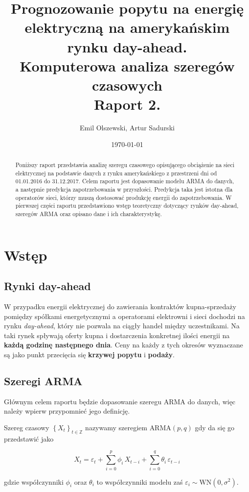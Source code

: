 \documentclass[11pt]{article}
\author{Emil Olszewski, Artur Sadurski}
\date{\today}
\title{Prognozowanie popytu na energię elektryczną na amerykańskim rynku day-ahead. \\ \large Komputerowa analiza szeregów czasowych \\ \large Raport 2. }
\begin{document}
\maketitle

\begin{abstract}
Poniższy raport przedstawia analizę szeregu czasowego opisującego obciążenie na sieci elektrycznej na podstawie danych z rynku amerykańskiego z przestrzeni dni od 01.01.2016 do 31.12.2017. Celem raportu jest dopasowanie modelu ARMA do danych, a następnie predykcja zapotrzebowania w przyszłości. Predykcja taka jest istotna dla operatorów sieci, którzy muszą dostosować produkcję energii do zapotrzebowania. W pierwszej części raportu przedstawiono wstęp teoretyczny dotyczący rynków day-ahead, szeregów ARMA oraz opisano dane i ich charakterystykę. 
\end{abstract}

\section{Wstęp}

\subsection{Rynki day-ahead} 

W przypadku energii elektrycznej do zawierania kontraktów kupna-sprzedaży pomiędzy spółkami energetycznymi a operatorami elektrowni i sieci dochodzi na rynku \textit{day-ahead}, który nie pozwala na ciągły handel między uczestnikami. Na taki rynek spływają oferty kupna i dostarczenia konkretnej ilości energii na \textbf{każdą godzinę następnego dnia}. Ceny na każdy z tych okresów wyznaczane są jako punkt przecięcia się \textbf{krzywej popytu} i \textbf{podaży}. 

\subsection{Szeregi ARMA}
Głównym celem raportu będzie dopasowanie szeregu ARMA do danych, więc należy wpierw przypomnieć jego definicję. 

\begin{definition}

Szereg czasowy ${\left\lbrace X_t \right\rbrace}_{t \in \mathbb{Z}}$ nazywamy szeregiem $\text{ARMA}(p, q)$ gdy da się go przedstawić jako

$$ X_t = \varepsilon_t + \sum_{i=0}^p \phi_i\,X_{t-i} + \sum_{i=0}^q \theta_i\,\varepsilon_{t-i} $$

gdzie współczynniki $\phi_i$ oraz $\theta_i$ to współczynniki modelu zaś $\varepsilon_i \sim \text{WN}(0, \sigma^2)$. 

\end{definition}
\end{document}
